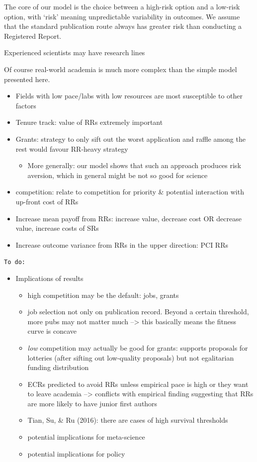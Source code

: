\documentclass[
  ,man,mask,floatsintext]{apa6}
\providecommand{\tightlist}{%
  \setlength{\itemsep}{0pt}\setlength{\parskip}{0pt}}
\begin{document}
The core of our model is the choice between a high-risk option and a low-risk option, with `risk' meaning unpredictable variability in outcomes.
We assume that the standard publication route always has greater risk than conducting a Registered Report.

Experienced scientists may have research lines

Of course real-world academia is much more complex than the simple model presented here.

\begin{itemize}
\tightlist
\item
  Fields with low pace/labs with low resources are most susceptible to other factors
\item
  Tenure track: value of RRs extremely important
\item
  Grants: strategy to only sift out the worst application and raffle among the rest would favour RR-heavy strategy

  \begin{itemize}
  \tightlist
  \item
    More generally: our model shows that such an approach produces risk aversion, which in general might be not so good for science
  \end{itemize}
\item
  competition: relate to competition for priority \& potential interaction with up-front cost of RRs
\item
  Increase mean payoff from RRs: increase value, decrease cost OR decrease value, increase costs of SRs
\item
  Increase outcome variance from RRs in the upper direction: PCI RRs
\end{itemize}

\texttt{To\ do:}

\begin{itemize}
\tightlist
\item
  Implications of results

  \begin{itemize}
  \item
    high competition may be the default: jobs, grants
  \item
    job selection not only on publication record. Beyond a certain threshold, more pubs may not matter much --\textgreater{} this basically means the fitness curve is concave
  \item
    \emph{low} competition may actually be good for grants: supports proposals for lotteries (after sifting out low-quality proposals) but not egalitarian funding distribution
  \item
    ECRs predicted to avoid RRs unless empirical pace is high or they want to leave academia --\textgreater{} conflicts with empirical finding suggesting that RRs are more likely to have junior first authors
  \item
    Tian, Su, \& Ru (2016): there are cases of high survival thresholds
  \item
    potential implications for meta-science
  \item
    potential implications for policy
  \end{itemize}
\end{itemize}
\end{document}
